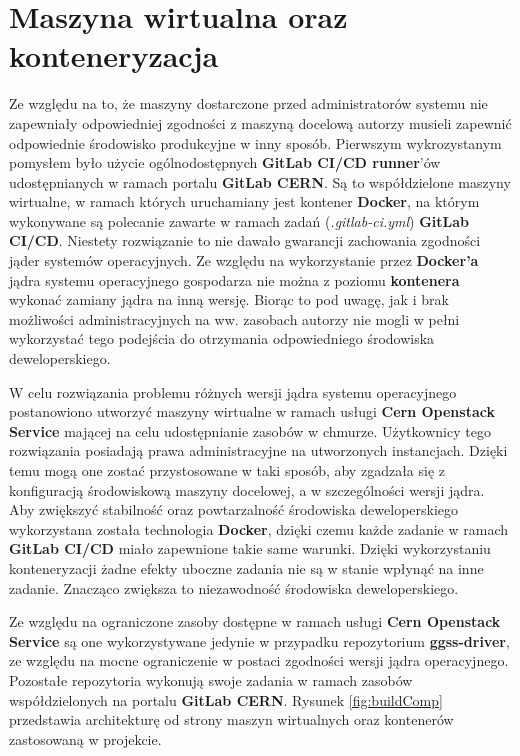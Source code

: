 \newpage
\section{Maszyna wirtualna oraz konteneryzacja}
\label{sec:wirtDocker}

Ze względu na to, że maszyny dostarczone przed administratorów systemu nie zapewniały odpowiedniej zgodności z maszyną docelową autorzy musieli zapewnić odpowiednie środowisko produkcyjne w inny sposób. Pierwszym wykrozystanym pomysłem było użycie ogólnodostępnych \textbf{GitLab CI/CD runner}'ów udostępnianych w ramach portalu \textbf{GitLab CERN}. Są to współdzielone maszyny wirtualne, w ramach których uruchamiany jest kontener \textbf{Docker}, na którym wykonywane są polecanie zawarte w ramach zadań (\textit{.gitlab-ci.yml}) \textbf {GitLab CI/CD}. Niestety rozwiązanie to nie dawało gwarancji zachowania zgodności jąder systemów operacyjnych. Ze względu na wykorzystanie przez \textbf{Docker'a} jądra systemu operacyjnego gospodarza nie można z poziomu \textbf{kontenera} wykonać zamiany jądra na inną wersję. Biorąc to pod uwagę, jak i brak możliwości administracyjnych na ww. zasobach autorzy nie mogli w pełni wykorzystać tego podejścia do otrzymania odpowiedniego środowiska deweloperskiego.

W celu rozwiązania problemu różnych wersji jądra systemu operacyjnego postanowiono utworzyć maszyny wirtualne w ramach usługi \textbf{Cern Openstack Service} mającej na celu udostępnianie zasobów w chmurze. Użytkownicy tego rozwiązania posiadają prawa administracyjne na utworzonych instancjach. Dzięki temu mogą one zostać przystosowane w taki sposób, aby zgadzała się z konfiguracją środowiskową maszyny docelowej, a w szczególności wersji jądra. Aby zwiększyć stabilność oraz powtarzalność środowiska deweloperskiego wykorzystana została technologia \textbf{Docker}, dzięki czemu każde zadanie w ramach \textbf{GitLab CI/CD} miało zapewnione takie same warunki. Dzięki wykorzystaniu konteneryzacji żadne efekty uboczne zadania nie są w stanie wpłynąć na inne zadanie. Znacząco zwiększa to niezawodność środowiska deweloperskiego.

Ze względu na ograniczone zasoby dostępne w ramach usługi \textbf{Cern Openstack Service} są one wykorzystywane jedynie w przypadku repozytorium \textbf{ggss-driver}, ze względu na mocne ograniczenie w postaci zgodności wersji jądra operacyjnego. Pozostałe repozytoria wykonują swoje zadania w ramach zasobów współdzielonych na portalu \textbf{GitLab CERN}. Rysunek \ref{fig:buildComp} przedstawia architekturę od strony maszyn wirtualnych oraz kontenerów zastosowaną w projekcie.


